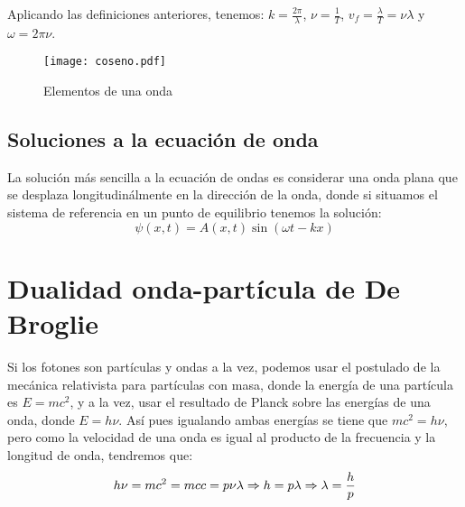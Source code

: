 Aplicando las definiciones anteriores, tenemos: $k=\frac{2\pi}{\lambda}$, $\nu=\frac{1}{T}$,
$v_f=\frac{\lambda}{T}=\nu\lambda$ y $\omega=2\pi\nu$.

\begin{figure}[b]
    \centering
    \texttt{[image: coseno.pdf]}
    \caption{Elementos de una onda}
    \label{fig:elementos-onda}
\end{figure}

\subsection{Soluciones a la ecuación de onda}\label{subsec:soluciones-a-la-ecuación-de-onda}
La solución más sencilla a la ecuación de ondas es considerar una onda plana que se desplaza longitudinálmente en la
dirección de la onda, donde si situamos el sistema de referencia en un punto de equilibrio tenemos la solución:
\begin{equation}
    \label{eq:solucion-ecuacion-ondas-simple}
    \psi(x,t)=A(x,t)\sin(\omega t-kx)
\end{equation}

\section{Dualidad onda-partícula de De Broglie}\label{sec:dualidad-onda-partícula-de-de-broglie}

Si los fotones son partículas y ondas a la vez, podemos usar el postulado de la mecánica relativista para partículas
con masa, donde la energía de una partícula es $E=m c^2$, y a la vez, usar el resultado de Planck sobre las energías
de una onda, donde $E=h\nu$. Así pues igualando ambas energías se tiene que $m c^2=h\nu$, pero como la velocidad de
una onda es igual al producto de la frecuencia y la longitud de onda, tendremos que:
\begin{equation}
    \label{eq:dualidad-onda-particula}
h\nu = m c^2 = m c c = p \nu\lambda\Rightarrow h = p\lambda\Rightarrow \lambda = \frac{h}{p}
\end{equation}
